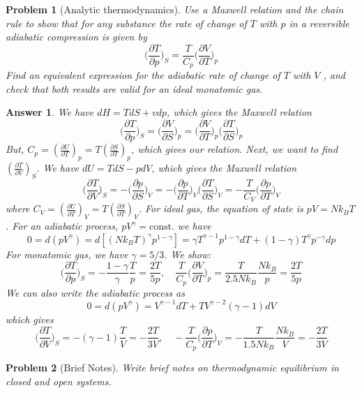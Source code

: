 \documentclass[a4paper]{article}
\newtheorem{ans}{Answer}[section]
\theoremstyle{new}
\newtheorem{qns}{Problem}[section]
\begin{document}
\begin{qns}[Analytic thermodynamics]
Use a Maxwell relation and the chain rule to show that for any substance the rate of change of $T$ with $p$ in a reversible adiabatic compression is given by
$$\bigg(\frac{\partial T}{\partial p}\bigg)_S=\frac{T}{C_p}\bigg(\frac{\partial V}{\partial T}\bigg)_p$$
Find an equivalent expression for the adiabatic rate of change of $T$ with $V$ , and check that both results are valid for an ideal monatomic gas.
\end{qns}
\begin{ans}
We have $dH=TdS+vdp$, which gives the Maxwell relation
$$\bigg(\frac{\partial T}{\partial p}\bigg)_S=\bigg(\frac{\partial V}{\partial S}\bigg)_p=\bigg(\frac{\partial V}{\partial T}\bigg)_p\bigg(\frac{\partial T}{\partial S}\bigg)_p$$
But, $C_p=(\frac{\partial U}{\partial T})_p=T(\frac{\partial S}{\partial T})_p$, which gives our relation. Next, we want to find $(\frac{\partial T}{\partial V})_S$. We have $dU=TdS-pdV$, which gives the Maxwell relation
$$\bigg(\frac{\partial T}{\partial V}\bigg)_S=-\bigg(\frac{\partial p}{\partial S}\bigg)_V=-\bigg(\frac{\partial p}{\partial T}\bigg)_V\bigg(\frac{\partial T}{\partial S}\bigg)_V=-\frac{T}{C_V}\bigg(\frac{\partial p}{\partial T}\bigg)_V$$
where $C_V=(\frac{\partial U}{\partial T})_V=T(\frac{\partial S}{\partial T})_V$. For ideal gas, the equation of state is $pV=Nk_BT$. For an adiabatic process, $pV^\gamma=\text{const.}$ we have
$$0=d(pV^\gamma)=d[(Nk_BT)^\gamma p^{1-\gamma}]=\gamma T^{\gamma-1}p^{1-\gamma}dT+(1-\gamma)T^\gamma p^{-\gamma}dp$$
For monatomic gas, we have $\gamma=5/3$. We show:
$$\bigg(\frac{\partial T}{\partial p}\bigg)_S=-\frac{1-\gamma}{\gamma}\frac{T}{p}=\frac{2T}{5p},\quad \frac{T}{C_p}\bigg(\frac{\partial V}{\partial T}\bigg)_p=\frac{T}{2.5Nk_B}\frac{Nk_B}{p}=\frac{2T}{5p}$$
We can also write the adiabatic process as
$$0=d(pV^\gamma)=V^{\gamma-1}dT+TV^{\gamma-2}(\gamma-1)dV$$
which gives
$$\bigg(\frac{\partial T}{\partial V}\bigg)_S=-(\gamma-1)\frac{T}{V}=-\frac{2T}{3V},\quad -\frac{T}{C_p}\bigg(\frac{\partial p}{\partial T}\bigg)_V=-\frac{T}{1.5Nk_B}\frac{Nk_B}{V}=-\frac{2T}{3V}$$
\end{ans}
\begin{qns}[Brief Notes]
Write brief notes on thermodynamic equilibrium in closed and open systems.
\end{qns}
\end{document}
